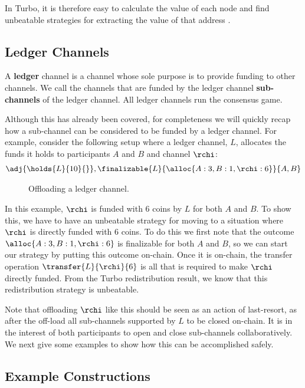 In Turbo, it is therefore easy to calculate the value of each node and find unbeatable strategies for extracting the value of that address .

\subsection{Ledger Channels}

A \textbf{ledger} channel is a channel whose sole purpose is to provide funding to other channels.
We call the channels that are funded by the ledger channel \textbf{sub-channels} of the ledger channel.
All ledger channels run the consensus game.

Although this has already been covered, for completeness we will quickly recap how a sub-channel can be considered to be funded by a ledger channel.
For example, consider the following setup where a ledger channel, $L$, allocates the funds it holds to participants $A$ and $B$ and channel $\rchi$:
\begin{align}
  \adj{\holds{L}{10}{}}, \finalizable{L}{\alloc{A: 3, B: 1, \rchi: 6}}{A, B}
\end{align}
\begin{figure}[h]\centering
  \makebox[\textwidth][c]{}
  \caption{
    Offloading a ledger channel.
  }\label{fig:ledger-offload}
\end{figure}
In this example, $\rchi$ is funded with 6 coins by $L$ for both $A$ and $B$.
To show this, we have to have an unbeatable strategy for moving to a situation where $\rchi$ is directly funded with 6 coins.
To do this we first note that the outcome $\alloc{A: 3, B: 1, \rchi: 6}$ is finalizable for both $A$ and $B$, so we can start our strategy by putting this outcome on-chain.
Once it is on-chain, the transfer operation $\transfer{L}{\rchi}{6}$ is all that is required to make $\rchi$ directly funded.
From the Turbo redistribution result, we know that this redistribution strategy is unbeatable.

Note that offloading $\rchi$ like this should be seen as an action of last-resort, as after the off-load all sub-channels supported by $L$ to be closed on-chain.
It is in the interest of both participants to open and close sub-channels collaboratively.
We next give some examples to show how this can be accomplished safely.

\subsection{Example Constructions}

